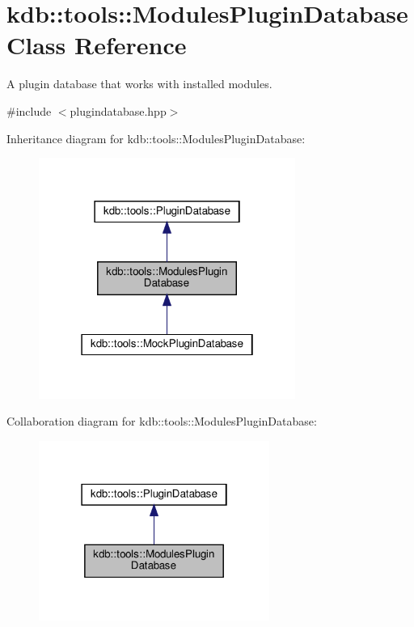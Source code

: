 \hypertarget{classkdb_1_1tools_1_1ModulesPluginDatabase}{}\section{kdb\+:\+:tools\+:\+:Modules\+Plugin\+Database Class Reference}
\label{classkdb_1_1tools_1_1ModulesPluginDatabase}


A plugin database that works with installed modules.  




{\ttfamily \#include $<$plugindatabase.\+hpp$>$}



Inheritance diagram for kdb\+:\+:tools\+:\+:Modules\+Plugin\+Database\+:
\nopagebreak
\begin{figure}[H]
\begin{center}
\leavevmode
\includegraphics[width=238pt]{classkdb_1_1tools_1_1ModulesPluginDatabase__inherit__graph}
\end{center}
\end{figure}


Collaboration diagram for kdb\+:\+:tools\+:\+:Modules\+Plugin\+Database\+:
\nopagebreak
\begin{figure}[H]
\begin{center}
\leavevmode
\includegraphics[width=214pt]{classkdb_1_1tools_1_1ModulesPluginDatabase__coll__graph}
\end{center}
\end{figure}
